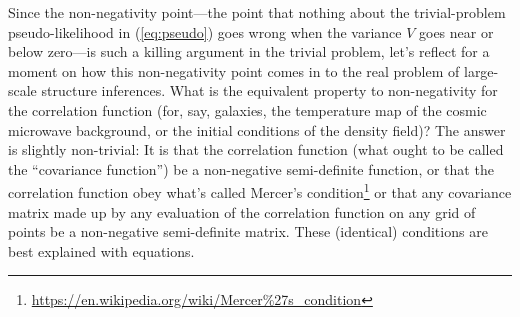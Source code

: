 \documentclass[12pt, letterpaper, preprint]{aastex}
\begin{document}
Since the non-negativity point---the point that nothing about the trivial-problem
pseudo-likelihood in (\ref{eq:pseudo}) goes wrong when the variance
$V$ goes near or below zero---is such a killing argument in the
trivial problem, let's reflect for a moment on how this non-negativity
point comes in to the real problem of large-scale structure
inferences.
What is the equivalent property to non-negativity for the correlation
function (for, say, galaxies, the temperature map of the cosmic
microwave background, or the initial conditions of the density field)?
The answer is slightly non-trivial:
It is that the correlation function (what ought to be called the
``covariance function'') be a non-negative semi-definite function, or
that the correlation function obey what's called Mercer's condition\footnote{\url{https://en.wikipedia.org/wiki/Mercer\%27s_condition}}
or that any covariance matrix made up by any evaluation of the
correlation function on any grid of points be a non-negative
semi-definite matrix.
These (identical) conditions are best explained with equations.
\end{document}
